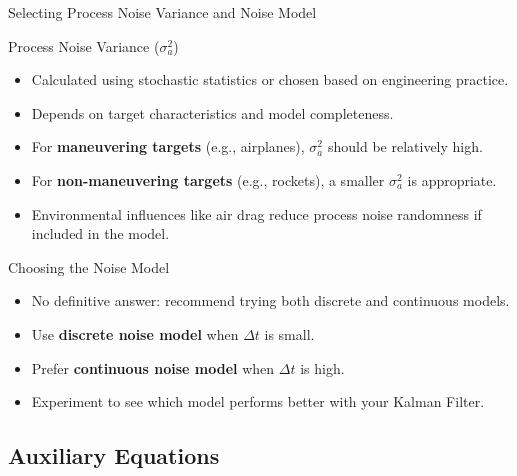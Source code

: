 \begin{frame}{Selecting Process Noise Variance and Noise Model} 
\begin{block}{Process Noise Variance ($\sigma_a^2$)}
\begin{itemize}
    \item Calculated using stochastic statistics or chosen based on engineering practice.
    \item Depends on target characteristics and model completeness.
    \item For \textbf{maneuvering targets} (e.g., airplanes), $\sigma_a^2$ should be relatively high.
    \item For \textbf{non-maneuvering targets} (e.g., rockets), a smaller $\sigma_a^2$ is appropriate.
    \item Environmental influences like air drag reduce process noise randomness if included in the model.
\end{itemize}
\end{block}

\begin{block}{Choosing the Noise Model}
\begin{itemize}
    \item No definitive answer: recommend trying both discrete and continuous models.
    \item Use \textbf{discrete noise model} when $\Delta t$ is small.
    \item Prefer \textbf{continuous noise model} when $\Delta t$ is high.
    \item Experiment to see which model performs better with your Kalman Filter.
\end{itemize}
\end{block}
\end{frame}

\subsection{Auxiliary Equations}
